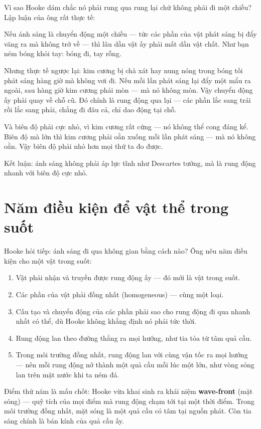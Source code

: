 Vì sao Hooke dám chắc nó phải rung qua rung lại chứ không phải đi một chiều? Lập luận của ông rất thực tế:

Nếu ánh sáng là chuyển động một chiều — tức các phần của vật phát sáng bị đẩy văng ra mà không trở về — thì lâu dần vật ấy phải mất dần vật chất. Như bạn ném bóng khỏi tay: bóng đi, tay rỗng.

Nhưng thực tế ngược lại: kim cương bị chà xát hay nung nóng trong bóng tối phát sáng hàng giờ mà không vơi đi. Nếu mỗi lần phát sáng lại đẩy một mẩu ra ngoài, sau hàng giờ kim cương phải mòn — mà nó không mòn. Vậy chuyển động ấy phải quay về chỗ cũ. Đó chính là rung động qua lại — các phần lắc sang trái rồi lắc sang phải, chẳng đi đâu cả, chỉ dao động tại chỗ.

Và biên độ phải cực nhỏ, vì kim cương rất cứng — nó không thể cong đáng kể. Biên độ mà lớn thì kim cương phải oằn xuống mỗi lần phát sáng — mà nó không oằn. Vậy biên độ phải nhỏ hơn mọi thứ ta đo được.

Kết luận: ánh sáng không phải áp lực tĩnh như Descartes tưởng, mà là rung động nhanh với biên độ cực nhỏ.


\section{Năm điều kiện để vật thể trong suốt}

Hooke hỏi tiếp: ánh sáng đi qua không gian bằng cách nào? Ông nêu năm điều kiện cho một vật trong suốt:

\begin{enumerate}
  \item Vật phải nhận và truyền được rung động ấy — đó mới là vật trong suốt.
  \item Các phần của vật phải đồng nhất (homogeneous) — cùng một loại.
  \item Cấu tạo và chuyển động của các phần phải sao cho rung động đi qua nhanh nhất có thể, dù Hooke không khẳng định nó phải tức thời.
  \item Rung động lan theo đường thẳng ra mọi hướng, như tia tỏa từ tâm quả cầu.
  \item Trong môi trường đồng nhất, rung động lan với cùng vận tốc ra mọi hướng — nên mỗi rung động nở thành một quả cầu mỗi lúc một lớn, như vòng sóng lan trên mặt nước khi ta ném đá.
\end{enumerate}

Điểm thứ năm là mấu chốt: Hooke vừa khai sinh ra khái niệm \textbf{wave-front} (mặt sóng) — quỹ tích của mọi điểm mà rung động chạm tới tại một thời điểm. Trong môi trường đồng nhất, mặt sóng là một quả cầu có tâm tại nguồn phát. Còn tia sáng chính là bán kính của quả cầu ấy.

